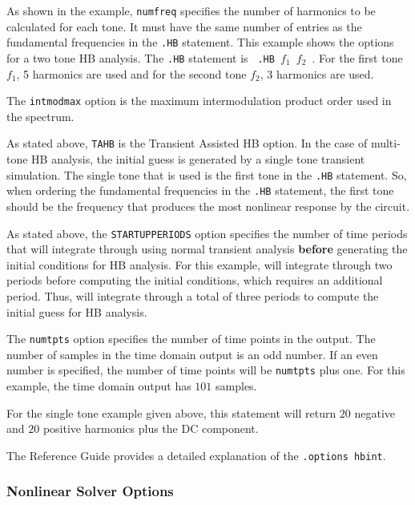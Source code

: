 As shown in the example, \texttt{numfreq} specifies the number of
harmonics to be calculated for each tone. It must have the same number
of entries as the fundamental frequencies in the \verb|.HB| statement.
This example shows the options for a two tone HB analysis.  The
\verb|.HB| statement is \texttt{ .HB $f_1$ $f_2$ }. For the first tone
$f_1$, 5 harmonics are used and for the second tone $f_2$, 3 harmonics
are used.

The \texttt{intmodmax} option is the maximum intermodulation product
order used in the spectrum.

As stated above, \texttt{TAHB} is the Transient Assisted HB option. In
the case of multi-tone HB analysis, the initial guess is generated by
a single tone transient simulation.  The single tone that is used is
the first tone in the \verb|.HB| statement.  So, when ordering the
fundamental frequencies in the \verb|.HB| statement, the first tone
should be the frequency that produces the most nonlinear response by
the circuit.

As stated above, the \texttt{STARTUPPERIODS} option specifies the
number of time periods that \Xyce{} will integrate through using
normal transient analysis \textbf{before} generating the initial
conditions for HB analysis.  For this example, \Xyce{} will integrate
through two periods before computing the initial conditions, which
requires an additional period.  Thus, \Xyce{} will integrate through a
total of three periods to compute the initial guess for HB analysis.

The \texttt{numtpts} option specifies the number of time points in the
output. The number of samples in the time domain output is an odd
number. If an even number is specified, the number of time points will
be \texttt{numtpts} plus one. For this example, the time domain output
has $101$ samples.


For the single tone example given above, this statement will return
$20$ negative and $20$ positive harmonics plus the DC component.

The \Xyce{} Reference Guide\ReferenceGuide{} provides a detailed
explanation of the \verb|.options hbint|.

\subsubsection{Nonlinear Solver Options}

